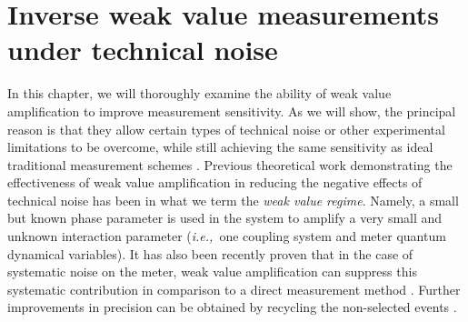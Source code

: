 \chapter[Weak values under noise]{Inverse weak value measurements under technical noise}\label{ch:iwv}
 

In this chapter, we will thoroughly examine the ability of weak value amplification to improve measurement sensitivity.  As we will show, the principal reason is that they allow certain types of technical noise or other experimental limitations to be overcome, while still achieving the same sensitivity as ideal traditional measurement schemes \cite{Starling2009,Jordan2014,Knee2014,Viza2015,Alves2015,Torres2016,Harris2016}.  Previous theoretical work demonstrating the effectiveness of weak value amplification in reducing the negative effects of technical noise has been in what we term the \emph{weak value regime}.  Namely, a small but known phase parameter is used in the system to amplify a very small and unknown interaction parameter (\emph{i.e.,}~one coupling system and meter quantum dynamical variables).  It has also been recently proven that in the case of systematic noise on the meter, weak value amplification can suppress this systematic contribution in comparison to a direct measurement method \cite{Pang2016}.  Further improvements in precision can be obtained by recycling the non-selected events \cite{Dressel2013,Lyons2015,Byard2015,Wang2016}.

